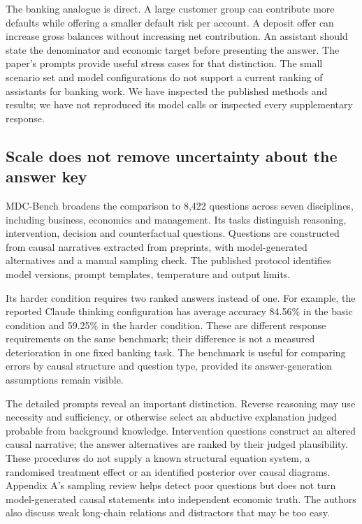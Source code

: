 The banking analogue is direct. A large customer group can contribute more
defaults while offering a smaller default risk per account. A deposit offer
can increase gross balances without increasing net contribution. An assistant
should state the denominator and economic target before presenting the
answer. The paper's prompts provide useful stress cases for that distinction.
The small scenario set and model configurations do not support a current
ranking of assistants for banking work. We have inspected the published
methods and results; we have not reproduced its model calls or inspected every
supplementary response.

\subsection{Scale does not remove uncertainty about the answer key}
MDC-Bench broadens the comparison to 8,422 questions across seven disciplines,
including business, economics and management. Its tasks distinguish reasoning,
intervention, decision and counterfactual questions. Questions are constructed
from causal narratives extracted from preprints, with model-generated
alternatives and a manual sampling check. The published protocol identifies
model versions, prompt templates, temperature and output limits.
\citep[Sections 2--3 and Appendix A]{gap29mdc}

Its harder condition requires two ranked answers instead of one. For example,
the reported Claude thinking configuration has average accuracy 84.56\% in
the basic condition and 59.25\% in the harder condition. These are different
response requirements on the same benchmark; their difference is not a
measured deterioration in one fixed banking task. The benchmark is useful
for comparing errors by causal structure and question type, provided its
answer-generation assumptions remain visible.

The detailed prompts reveal an important distinction. Reverse reasoning may
use necessity and sufficiency, or otherwise select an abductive explanation
judged probable from background knowledge. Intervention questions construct
an altered causal narrative; the answer alternatives are ranked by their
judged plausibility. These procedures do not supply a known structural
equation system, a randomised treatment effect or an identified posterior
over causal diagrams. Appendix A's sampling review helps detect poor
questions but does not turn model-generated causal statements into independent
economic truth. The authors also discuss weak long-chain relations and
distractors that may be too easy. \citep[Limitations; Tables 28--29 and
39--40]{gap29mdc}

